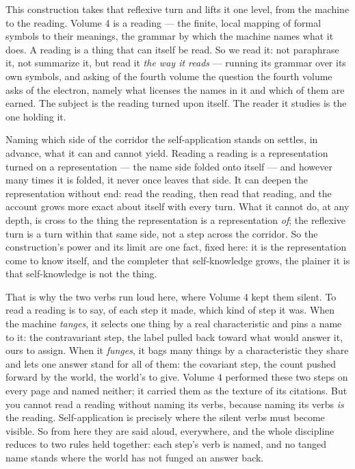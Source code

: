 This construction takes that reflexive turn and lifts it one level, from the machine to the reading.
Volume 4 is a reading --- the finite, local mapping of formal symbols to their meanings, the grammar by which the machine
names what it does.
A reading is a thing that can itself be read.
So we read it: not paraphrase it, not summarize it, but read it \emph{the way it reads} --- running its grammar over its
own symbols, and asking of the fourth volume the question the fourth volume asks of the electron, namely what licenses the
names in it and which of them are earned.
The subject is the reading turned upon itself.
The reader it studies is the one holding it.

Naming which side of the corridor the self-application stands on settles, in advance, what it can and cannot yield.
Reading a reading is a representation turned on a representation --- the name side folded onto itself --- and however
many times it is folded, it never once leaves that side.
It can deepen the representation without end: read the reading, then read that reading, and the account grows more exact
about itself with every turn.
What it cannot do, at any depth, is cross to the thing the representation is a representation \emph{of}; the reflexive
turn is a turn within that same side, not a step across the corridor.
So the construction's power and its limit are one fact, fixed here: it is the representation come to know itself, and the
completer that self-knowledge grows, the plainer it is that self-knowledge is not the thing.

That is why the two verbs run loud here, where Volume 4 kept them silent.
To read a reading is to say, of each step it made, which kind of step it was.
When the machine \emph{tanges}, it selects one thing by a real characteristic and pins a name to it: the contravariant
step, the label pulled back toward what would answer it, ours to assign.
When it \emph{funges}, it bags many things by a characteristic they share and lets one answer stand for all of them: the
covariant step, the count pushed forward by the world, the world's to give.
Volume 4 performed these two steps on every page and named neither; it carried them as the texture of its citations.
But you cannot read a reading without naming its verbs, because naming its verbs \emph{is} the reading.
Self-application is precisely where the silent verbs must become visible.
So from here they are said aloud, everywhere, and the whole discipline reduces to two rules held together: each step's
verb is named, and no tanged name stands where the world has not funged an answer back.

